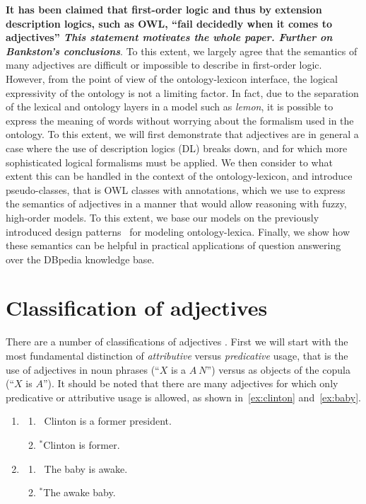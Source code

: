 \documentclass[11pt]{article}
\begin{document}
\textbf{It has been claimed that first-order logic and thus by extension description 
logics, such as OWL, ``fail decidedly when it comes to adjectives''
\cite{bankston2003modeling}\textit{This statement motivates the whole paper. Further on Bankston's conclusions}}. To this extent, we largely agree that the semantics 
of many adjectives are difficult or impossible to describe in first-order logic. 
However, from the point of view of the ontology-lexicon interface, the logical 
expressivity of the ontology is not a limiting factor. In fact, due to the 
separation of the lexical and ontology layers in a model such as \emph{lemon}, 
it is possible to express the meaning of words without worrying about the 
formalism used in the ontology. To this extent, we will first demonstrate that 
adjectives are in general a case where the use of description logics (DL) breaks down, 
and for which more sophisticated logical formalisms must be applied. We then 
consider to what extent this can be handled in the context of the 
ontology-lexicon, and introduce pseudo-classes, that is OWL classes with 
annotations, which we use to express the semantics of adjectives in a manner
that would allow reasoning with fuzzy, high-order models. To this extent, we base
our models on the previously introduced design patterns~\cite{mccrae2014design}
for modeling ontology-lexica. 
Finally, we show how these semantics can be helpful in practical applications 
of question answering over the DBpedia knowledge base.

\section{Classification of adjectives}

There are a number of classifications of adjectives \cite{}. First we will start 
with the most fundamental distinction of \emph{attributive} versus 
\emph{predicative} usage, that is the use of adjectives in noun phrases 
(``$X$ is a $A~N$'') versus as objects of the copula (``$X$ is $A$''). 
It should be noted that there are many adjectives for which only predicative or 
attributive usage is allowed, as shown in~\ref{ex:clinton} and~\ref{ex:baby}.

\begin{enumerate}[resume]
\item \begin{enumerate}	
\item \ Clinton is a former president.
\item $^*$Clinton is former.
\end{enumerate}
\label{ex:clinton}
\item \begin{enumerate}	
\item \ The baby is awake.
\item $^*$The awake baby.
\end{enumerate}
\label{ex:baby}
\end{enumerate}
\end{document}
